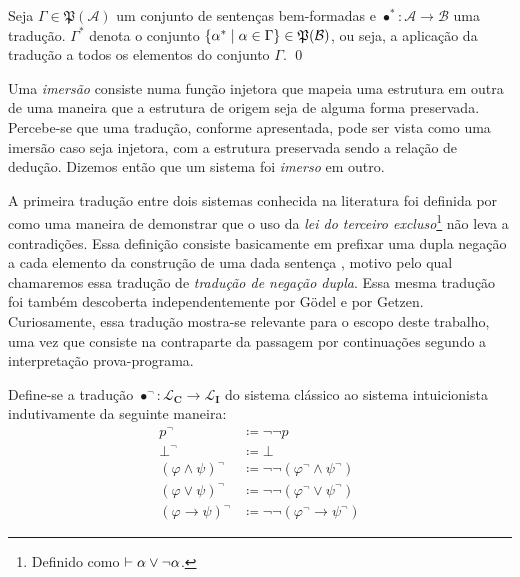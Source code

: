 \begin{tcolorbox}[enhanced jigsaw, breakable, sharp corners, colframe=black, colback=white, boxrule=0.5pt, left=1.5mm, right=1.5mm, top=1.5mm, bottom=1.5mm]
\begin{notation}
    Seja $\Gamma\in\mathfrak{P}(\mathcal{A})$ um conjunto de sentenças bem-formadas e $\bullet^*\mathrel{:}\mathcal{A}\to\mathcal{B}$ uma tradução. $\Gamma^*$ denota o conjunto $\left\{\alpha^*\mid\alpha\in\Gamma\right\}\in\mathfrak{P}(\mathcal{B})$, ou seja, a aplicação da tradução a todos os elementos do conjunto $\Gamma$.
    \qed{}
\end{notation}
\end{tcolorbox}

Uma \emph{imersão} consiste numa função injetora que mapeia uma estrutura em outra de uma maneira que a estrutura de origem seja de alguma forma preservada.
Percebe-se que uma tradução, conforme apresentada, pode ser vista como uma imersão caso seja injetora, com a estrutura preservada sendo a relação de dedução.
Dizemos então que um sistema foi \emph{imerso} em outro.

A primeira tradução entre dois sistemas conhecida na literatura foi definida por~\cite{Kolmogorov} como uma maneira de demonstrar que o uso da \emph{lei do terceiro excluso}\footnote{Definido como $\mathrel{\vdash}\alpha\vee\neg\alpha$.} não leva a contradições. Essa definição consiste basicamente em prefixar uma dupla negação a cada elemento da construção de uma dada sentença \citep{Coniglio}, motivo pelo qual chamaremos essa tradução de \emph{tradução de negação dupla}. Essa mesma tradução foi também descoberta independentemente por Gödel e por Getzen. Curiosamente, essa tradução mostra-se relevante para o escopo deste trabalho, uma vez que consiste na contraparte da passagem por continuações segundo a interpretação prova-programa.

\begin{tcolorbox}[enhanced jigsaw, breakable, sharp corners, colframe=black, colback=white, boxrule=0.5pt, left=1.5mm, right=1.5mm, top=1.5mm, bottom=1.5mm]
\begin{example} Define-se a tradução $\bullet^\neg:\mathcal{L}_\mathbf{C}\to\mathcal{L}_\mathbf{I}$ do sistema clássico ao sistema intuicionista indutivamente da seguinte maneira:
    \begin{align*}
        p^\neg&\coloneqq\neg\neg p\\
        \bot^\neg&\coloneqq\bot\\
        {(\varphi\wedge\psi)}^\neg&\coloneqq\neg\neg(\varphi^\neg \wedge \psi^\neg)\\
        {(\varphi\vee\psi)}^\neg&\coloneqq\neg\neg (\varphi^\neg \vee \psi^\neg)\\
        {(\varphi\to\psi)}^\neg&\coloneqq\neg\neg (\varphi^\neg \to \psi^\neg)
        \tag*{\qed} 
    \end{align*}
\end{example}
\end{tcolorbox}

